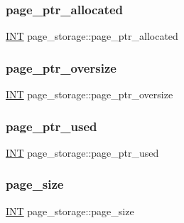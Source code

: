 \subsubsection{\texorpdfstring{page\+\_\+ptr\+\_\+allocated}{page\_ptr\_allocated}}
{\footnotesize\ttfamily \mbox{\hyperlink{galois_8h_a09fddde158a3a20bd2dcadb609de11dc}{I\+NT}} page\+\_\+storage\+::page\+\_\+ptr\+\_\+allocated}

\mbox{\label{classpage__storage_a254a2475a250db72b64cf8f2379ecb64}} 
\subsubsection{\texorpdfstring{page\+\_\+ptr\+\_\+oversize}{page\_ptr\_oversize}}
{\footnotesize\ttfamily \mbox{\hyperlink{galois_8h_a09fddde158a3a20bd2dcadb609de11dc}{I\+NT}} page\+\_\+storage\+::page\+\_\+ptr\+\_\+oversize}

\mbox{\label{classpage__storage_a2d2b8b89bdfc3ef90526c539cea84a20}} 
\subsubsection{\texorpdfstring{page\+\_\+ptr\+\_\+used}{page\_ptr\_used}}
{\footnotesize\ttfamily \mbox{\hyperlink{galois_8h_a09fddde158a3a20bd2dcadb609de11dc}{I\+NT}} page\+\_\+storage\+::page\+\_\+ptr\+\_\+used}

\mbox{\label{classpage__storage_a902d760b17d91891bae23f889161bcf8}} 
\subsubsection{\texorpdfstring{page\+\_\+size}{page\_size}}
{\footnotesize\ttfamily \mbox{\hyperlink{galois_8h_a09fddde158a3a20bd2dcadb609de11dc}{I\+NT}} page\+\_\+storage\+::page\+\_\+size}

